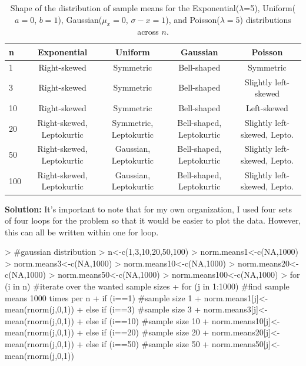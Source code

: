 \documentclass{article}
\begin{document}
\begin{enumerate}
\begin{enumerate}
  \begin{table}[H]
	  \begin{center}
		  \begin{tabular} {|l|c|c|c|c|} \hline
			    n & Exponential  & Uniform   & Gaussian & Poisson\\\hline\hline
			    1 & Right-skewed & Symmetric & Bell-shaped & Symmetric\\
			    3 & Right-skewed & Symmetric & Bell-shaped & Slightly left-skewed\\
			    10& Right-skewed & Symmetric & Bell-shaped & Left-skewed\\
			    20& Right-skewed, Leptokurtic & Symmetric, Leptokurtic & Bell-shaped, Leptokurtic & Slightly left-skewed, Lepto.\\
			    50& Right-skewed, Leptokurtic & Gaussian, Leptokurtic & Bell-shaped, Leptokurtic & Slightly left-skewed, Lepto.\\
			    100& Right-skewed, Leptokurtic & Gaussian, Leptokurtic & Bell-shaped, Leptokurtic & Slightly left-skewed, Lepto.\\\hline
		  \end{tabular}
		  \caption{Shape of the distribution of sample means for the 
		  Exponential($\lambda$=5), Uniform($a=0$, $b=1$), Gaussian($\mu_x=0$, $\sigma-x=1$), and Poisson($\lambda=5$) distributions
		  across $n$.}\label{psim}
	  \end{center}
  \end{table}
  \textbf{Solution:}
  \newline
It's important to note that for my own organization, I used four sets of four loops for the problem so that it would be easier to plot the data. However, this can all be written within one for loop.
\begin{Schunk}
\begin{Sinput}
> #gaussian distribution
> n<-c(1,3,10,20,50,100)
> norm.means1<-c(NA,1000)
> norm.means3<-c(NA,1000)
> norm.means10<-c(NA,1000)
> norm.means20<-c(NA,1000)
> norm.means50<-c(NA,1000)
> norm.means100<-c(NA,1000)
> for (i in n){ #iterate over the wanted sample sizes
+   for (j in 1:1000){ #find sample means 1000 times per n
+     if (i==1){ #sample size 1
+     norm.means1[j]<-mean(rnorm(j,0,1))
+     } else if (i==3) {#sample size 3
+       norm.means3[j]<-mean(rnorm(j,0,1))
+     } else if (i==10) {#sample size 10
+       norm.means10[j]<-mean(rnorm(j,0,1))
+     } else if (i==20) {#sample size 20
+       norm.means20[j]<-mean(rnorm(j,0,1))
+     } else if (i==50) {#sample size 50
+       norm.means50[j]<-mean(rnorm(j,0,1))
}}}
\end{Sinput}
\end{Schunk}
\end{enumerate}
\end{enumerate}
\end{document}
